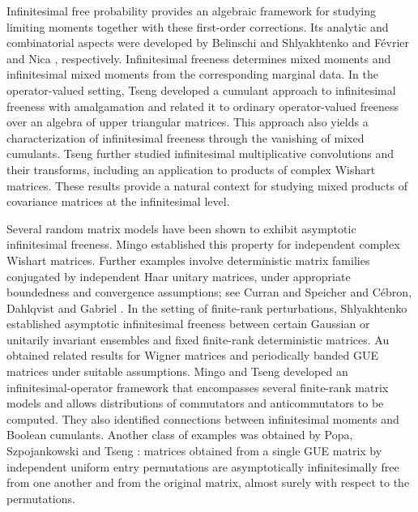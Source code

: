 \documentclass{article}
\theoremstyle{definition}
\begin{document}
Infinitesimal free probability provides an algebraic framework
for studying limiting moments together with these first-order
corrections. Its analytic and combinatorial aspects were
developed by Belinschi and Shlyakhtenko \cite{BS} and
F\'evrier and Nica \cite{FN10}, respectively.
Infinitesimal freeness determines mixed moments and
infinitesimal mixed moments from the corresponding marginal
data.
In the operator-valued setting, Tseng \cite{T23} developed
a cumulant approach to infinitesimal freeness with amalgamation
and related it to ordinary operator-valued freeness over an
algebra of upper triangular matrices.
This approach also yields a characterization of infinitesimal
freeness through the vanishing of mixed cumulants.
Tseng \cite{T25} further studied infinitesimal multiplicative
convolutions and their transforms, including an application
to products of complex Wishart matrices.
These results provide a natural context for studying mixed
products of covariance matrices at the infinitesimal level.

Several random matrix models have been shown to exhibit
asymptotic infinitesimal freeness.
Mingo \cite{Mingo19} established this property for independent
complex Wishart matrices.
Further examples involve deterministic matrix families
conjugated by independent Haar unitary matrices, under
appropriate boundedness and convergence assumptions;
see Curran and Speicher \cite{CS11} and
C\'ebron, Dahlqvist and Gabriel \cite{CDG22}.
In the setting of finite-rank perturbations, Shlyakhtenko
\cite{Shl18} established asymptotic infinitesimal freeness
between certain Gaussian or unitarily invariant ensembles
and fixed finite-rank deterministic matrices.
Au \cite{Au21} obtained related results for Wigner matrices
and periodically banded GUE matrices under suitable
assumptions.
Mingo and Tseng \cite{MT24} developed an infinitesimal-operator
framework that encompasses several finite-rank matrix models
and allows distributions of commutators and anticommutators
to be computed.
They also identified connections between infinitesimal
moments and Boolean cumulants.
Another class of examples was obtained by Popa,
Szpojankowski and Tseng \cite{PST22}: matrices obtained
from a single GUE matrix by independent uniform entry
permutations are asymptotically infinitesimally free from
one another and from the original matrix, almost surely
with respect to the permutations.
\end{document}
